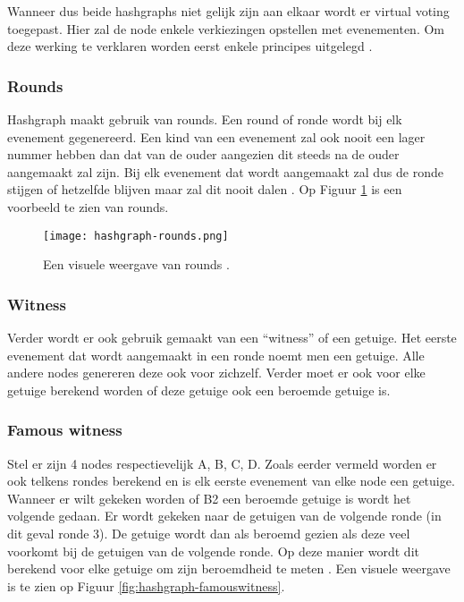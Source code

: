 Wanneer dus beide hashgraphs niet gelijk zijn aan elkaar wordt er virtual voting toegepast. Hier zal de node enkele verkiezingen opstellen met evenementen. Om deze werking te verklaren worden eerst enkele principes uitgelegd \textcite{Baird2016a}.

\subsubsection{Rounds}
Hashgraph maakt gebruik van rounds. Een round of ronde wordt bij elk evenement gegenereerd. Een kind van een evenement zal ook nooit een lager nummer hebben dan dat van de ouder aangezien dit steeds na de ouder aangemaakt zal zijn. Bij elk evenement dat wordt aangemaakt zal dus de ronde stijgen of hetzelfde blijven maar zal dit nooit dalen
\textcite{Baird2016}. Op Figuur \ref{fig:hashgraph-rounds} is een voorbeeld te zien van rounds.

\begin{figure}
	\texttt{[image: hashgraph-rounds.png]}
	\caption{Een visuele weergave van rounds \textcite{Baird2016}.}
	\label{fig:hashgraph-rounds}
\end{figure}

\subsubsection{Witness}
Verder wordt er ook gebruik gemaakt van een ``witness'' of een getuige. Het eerste evenement dat wordt aangemaakt in een ronde noemt men een getuige. Alle andere nodes genereren deze ook voor zichzelf. Verder moet er ook voor elke getuige berekend worden of deze getuige ook een beroemde getuige is. 
\textcite{Baird2016}

\subsubsection{Famous witness}
Stel er zijn 4 nodes respectievelijk A, B, C, D. Zoals eerder vermeld worden er ook telkens rondes berekend en is elk eerste evenement van elke node een getuige. Wanneer er wilt gekeken worden of B2 een beroemde getuige is wordt het volgende gedaan. Er wordt gekeken naar de getuigen van de volgende ronde (in dit geval ronde 3). De getuige wordt dan als beroemd gezien als deze veel voorkomt bij de getuigen van de volgende ronde. Op deze manier wordt dit berekend voor elke getuige om zijn beroemdheid te meten
\textcite{Baird2016}. Een visuele weergave is te zien op Figuur \ref{fig:hashgraph-famouswitness}.

